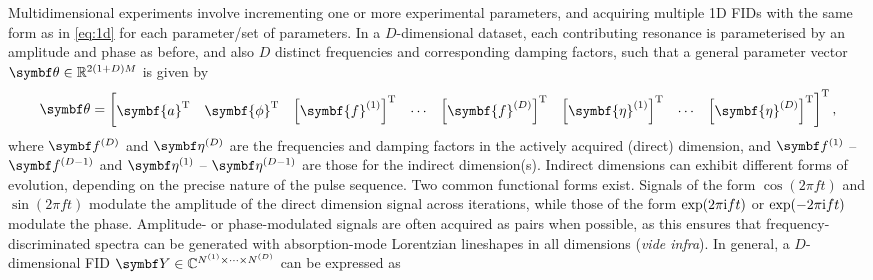 Multidimensional experiments involve incrementing one or more experimental
parameters, and acquiring multiple \ac{1D} \acp{FID} with the same form as in
\eqref{eq:1d} for each parameter/set of parameters. In a $D$-dimensional
dataset, each contributing resonance is parameterised by an amplitude and phase
as before, and also $D$ distinct frequencies and corresponding damping factors,
such that a general parameter vector  $\bth \in \mathbb{R}^{2(1+D)M}$ is
given by
\begin{equation}
    \bth =
    \begin{bmatrix}
    \symbf{a}\T &
    \symbf{\phi}\T &
    \left[\symbf{f}^{(1)}\right]\T &
    \cdots &
    \left[\symbf{f}^{(D)}\right]\T &
    \left[\symbf{\eta}^{(1)}\right]\T &
    \cdots &
    \left[\symbf{\eta}^{(D)}\right]\T
    \end{bmatrix}\T,
\end{equation}
where $\bdfD$ and $\bdetaD$ are the frequencies and damping factors in the
actively acquired (direct) dimension, and $\bdfone$ -- $\bdfDminusone$ and
$\bdetaone$ -- $\bdetaDminusone$ are those for the indirect dimension(s).
Indirect dimensions can exhibit different forms of evolution, depending on
the precise nature of the pulse sequence. Two common functional
forms exist\cite[Section 4.3.4]{Cavanagh2007}. Signals of the form $\cos(2 \pi
f t)$ and $\sin(2 \pi f t)$ modulate the amplitude of the direct
dimension signal across iterations, while those of the form $\exp(2 \pi \mathrm{i} f
t)$ or $\exp(-2 \pi \mathrm{i} f t)$ modulate the phase.  Amplitude- or
phase-modulated signals are often acquired as pairs when possible, as this
ensures that frequency-discriminated spectra can be generated with
absorption-mode Lorentzian lineshapes in all dimensions (\emph{vide infra}). In
general, a $D$-dimensional \ac{FID}
$\bY \in \mathbb{C}^{\None \times \cdots \times \ND}$ can be expressed as
